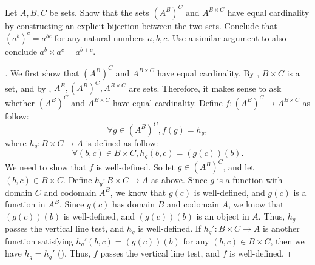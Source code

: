 \begin{ex}\label{i:ex:3.6.6}
  Let \(A, B, C\) be sets.
  Show that the sets \((A^B)^C\) and \(A^{B \times C}\) have equal cardinality by constructing an explicit bijection between the two sets.
  Conclude that \((a^b)^c = a^{bc}\) for any natural numbers \(a, b, c\).
  Use a similar argument to also conclude \(a^b \times a^c = a^{b+c}\).
\end{ex}

\begin{proof}[]
  We first show that \((A^B)^C\) and \(A^{B \times C}\) have equal cardinality.
  By , \(B \times C\) is a set, and by , \(A^B, (A^B)^C, A^{B \times C}\) are sets.
  Therefore, it makes sense to ask whether \((A^B)^C\) and \(A^{B \times C}\) have equal cardinality.
  Define \(f : (A^B)^C \to A^{B \times C}\) as follow:
  \[
    \forall g \in (A^B)^C, f(g) = h_g,
  \]
  where \(h_g : B \times C \to A\) is defined as follow:
  \[
    \forall (b, c) \in B \times C, h_g(b, c) = (g(c))(b).
  \]
  We need to show that \(f\) is well-defined.
  So let \(g \in (A^B)^C\), and let \((b, c) \in B \times C\).
  Define \(h_g : B \times C \to A\) as above.
  Since \(g\) is a function with domain \(C\) and codomain \(A^B\), we know that \(g(c)\) is well-defined, and \(g(c)\) is a function in \(A^B\).
  Since \(g(c)\) has domain \(B\) and codomain \(A\), we know that \((g(c))(b)\) is well-defined, and \((g(c))(b)\) is an object in \(A\).
  Thus, \(h_g\) passes the vertical line test, and \(h_g\) is well-defined.
  If \(h_g' : B \times C \to A\) is another function satisfying \(h_g'(b, c) = (g(c))(b)\) for any \((b, c) \in B \times C\), then we have \(h_g = h_g'\) ().
  Thus, \(f\) passes the vertical line test, and \(f\) is well-defined.


\end{proof}
